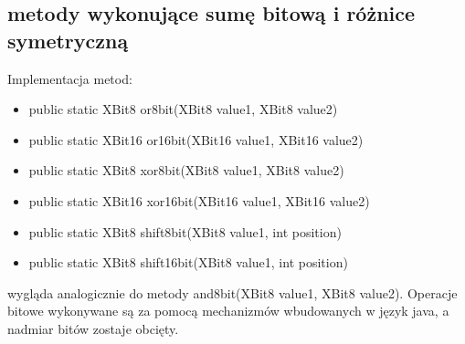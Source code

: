 	\subsection{metody wykonujące sumę bitową i różnice symetryczną}
	Implementacja metod:
	\begin{itemize}  
		\item public static XBit8 or8bit(XBit8 value1, XBit8 value2)
		\item public static XBit16 or16bit(XBit16 value1, XBit16 value2)
		\item public static XBit8 xor8bit(XBit8 value1, XBit8 value2)
		\item public static XBit16 xor16bit(XBit16 value1, XBit16 value2)
		\item public static XBit8 shift8bit(XBit8 value1, int position) 
		\item public static XBit8 shift16bit(XBit8 value1, int position)
	\end{itemize}
	wygląda analogicznie do metody and8bit(XBit8 value1, XBit8 value2). Operacje bitowe wykonywane są za pomocą mechanizmów wbudowanych w język java, a nadmiar bitów zostaje obcięty.
		


	
	
	